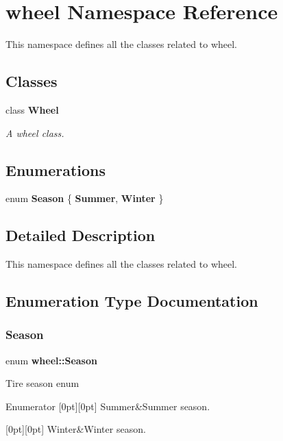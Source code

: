 \section{wheel Namespace Reference}
\label{namespacewheel}


This namespace defines all the classes related to wheel.  


\subsection*{Classes}
\begin{DoxyCompactItemize}
\item 
class {\bf Wheel}
\begin{DoxyCompactList}\small\item\em A wheel class. \end{DoxyCompactList}\end{DoxyCompactItemize}
\subsection*{Enumerations}
\begin{DoxyCompactItemize}
\item 
enum {\bf Season} \{ {\bf Summer}, 
{\bf Winter}
 \}
\end{DoxyCompactItemize}


\subsection{Detailed Description}
This namespace defines all the classes related to wheel. 

\subsection{Enumeration Type Documentation}
\label{namespacewheel_ac5192adf47f31ca94b2a2df3f3ecc0c4} 
\subsubsection{Season}
{\footnotesize\ttfamily enum {\bf wheel\+::\+Season}}

Tire season enum \begin{DoxyEnumFields}{Enumerator}
[0pt][0pt]{}\label{namespacewheel_ac5192adf47f31ca94b2a2df3f3ecc0c4a25738e58b7028667bcd0261d2a45f158} 
Summer&Summer season. \\
\hline

[0pt][0pt]{}\label{namespacewheel_ac5192adf47f31ca94b2a2df3f3ecc0c4a6ed9db328e912b9df4576cc27aad5be5} 
Winter&Winter season. \\
\hline

\end{DoxyEnumFields}

